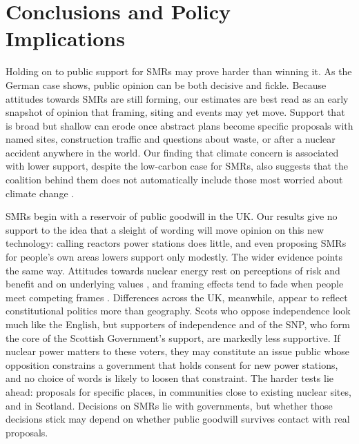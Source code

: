 \documentclass[a4paper, 11pt]{article}
\begin{document}
\section*{Conclusions and Policy Implications}
Holding on to public support for SMRs may prove harder than winning it. As the German case shows, public opinion can be both decisive and fickle. Because attitudes towards SMRs are still forming, our estimates are best read as an early snapshot of opinion that framing, siting and events may yet move. Support that is broad but shallow can erode once abstract plans become specific proposals with named sites, construction traffic and questions about waste, or after a nuclear accident anywhere in the world. Our finding that climate concern is associated with lower support, despite the low-carbon case for SMRs, also suggests that the coalition behind them does not automatically include those most worried about climate change \citep{corner2011,sonnberger2021}.

SMRs begin with a reservoir of public goodwill in the UK. Our results give no support to the idea that a sleight of wording will move opinion on this new technology: calling reactors power stations does little, and even proposing SMRs for people's own areas lowers support only modestly. The wider evidence points the same way. Attitudes towards nuclear energy rest on perceptions of risk and benefit and on underlying values \citep{aina_poy2026,degroot2013}, and framing effects tend to fade when people meet competing frames \citep{chong2007}. Differences across the UK, meanwhile, appear to reflect constitutional politics more than geography. Scots who oppose independence look much like the English, but supporters of independence and of the SNP, who form the core of the Scottish Government's support, are markedly less supportive. If nuclear power matters to these voters, they may constitute an issue public \citep{krosnick1990} whose opposition constrains a government that holds consent for new power stations, and no choice of words is likely to loosen that constraint. The harder tests lie ahead: proposals for specific places, in communities close to existing nuclear sites, and in Scotland. Decisions on SMRs lie with governments, but whether those decisions stick may depend on whether public goodwill survives contact with real proposals.

\singlespacing


  \setlength{\bibsep}{0.5em}




\newpage



\newpage



\newpage



\newpage



\newpage


\end{document}
